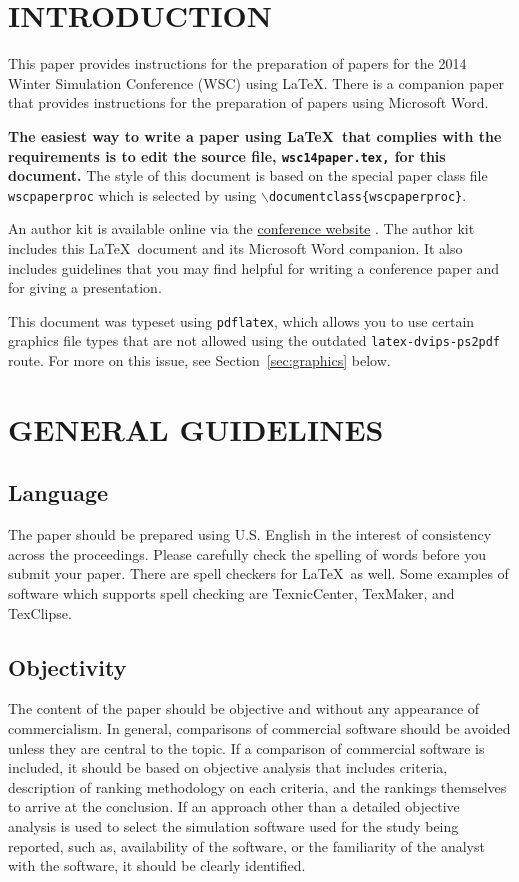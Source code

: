 \documentclass{wscpaperproc}
\theoremstyle{wsc}
\begin{document}
\section{INTRODUCTION}
\label{sec:intro}

This paper provides instructions for the preparation of papers for the 2014
Winter Simulation Conference (WSC) using \LaTeX. There is a companion paper that
provides instructions for the preparation of papers using Microsoft Word.

\textbf{The easiest way to write a paper using \LaTeX\ that complies with the
requirements is to edit the source file, {\tt wsc14paper.tex,} for this document.}
The style of this document is based on the special paper class file {\tt wscpaperproc} which is selected by using {\tt $\backslash$documentclass\{wscpaperproc\}}.

An author kit is available online via the  \href{http://www.wintersim.org}%
{conference website} \cite{WSC}.
The author kit includes this \LaTeX\ document and its Microsoft Word companion.
It also includes guidelines that you may find helpful for writing a conference paper and for giving a presentation.

This document was typeset using {\tt pdflatex}, which allows you to use certain
graphics file types that are not allowed using the outdated {\tt latex-dvips-ps2pdf} route.
For more on this issue, see Section~\ref{sec:graphics} below.

\section{GENERAL GUIDELINES}

\subsection{Language}

The paper should be prepared using U.S. English in the interest of consistency across the proceedings. Please carefully check the spelling of words before you submit your paper. There are spell checkers for \LaTeX\ as well.
Some examples of software which supports spell checking are TexnicCenter, TexMaker, and TexClipse.

\subsection{Objectivity}
The content of the paper should be objective and without any appearance of commercialism.  In general, comparisons of commercial software should be avoided unless they are central to the topic.  If a comparison of commercial software is included, it should be based on objective analysis that includes criteria, description of ranking methodology on each criteria, and the rankings themselves to arrive at the conclusion.
If an approach other than a detailed objective analysis is used to select the simulation software used for the study being reported, such as, availability of the software, or the familiarity of the analyst with the software, it should be clearly identified.
\end{document}
